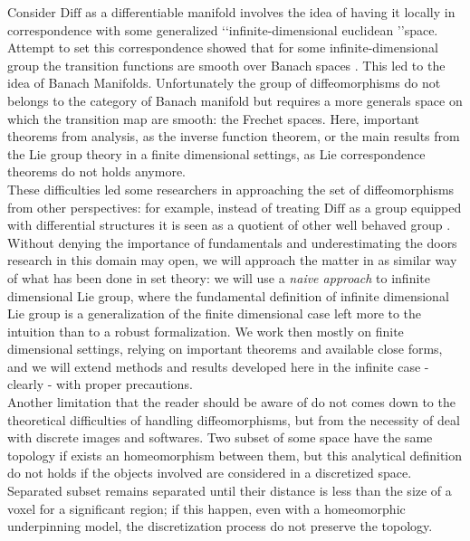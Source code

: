 Consider $\text{Diff}$ as a differentiable manifold involves the idea of having it locally in correspondence with some generalized \lq\lq infinite-dimensional euclidean \rq\rq space. Attempt to set this correspondence showed that for some infinite-dimensional group the transition functions are smooth over Banach spaces \cite{khesin2008geometry}. This led to the idea of Banach Manifolds. Unfortunately the group of diffeomorphisms do not belongs to the category of Banach manifold but requires a more generals space on which the transition map are smooth: the Frechet spaces. Here, important theorems from analysis, as the inverse function theorem, or the main results from the Lie group theory in a finite dimensional settings, as Lie correspondence theorems do not holds anymore.\\
These difficulties led some researchers in approaching the set of diffeomorphisms from other perspectives: 
for example, instead of treating $\text{Diff}$ as a group equipped with differential structures it is seen as a quotient of other well behaved group \cite{wojtynski1994one}.\\
Without denying the importance of fundamentals and underestimating the doors research in this domain may open, we will approach the matter in as similar way of what has been done in set theory: we will use a \emph{naive approach} to infinite dimensional Lie group, where the fundamental definition of infinite dimensional Lie group is a generalization of the finite dimensional case left more to the intuition than to a robust formalization. 
We work then mostly on finite dimensional settings, relying on important theorems and available close forms, and we will extend methods and results developed here in the infinite case -clearly - with proper precautions.\\

Another limitation that the reader should be aware of do not comes down to the theoretical difficulties of handling diffeomorphisms, but from the necessity of deal with discrete images and softwares. Two subset of some space have the same topology if exists an homeomorphism between them, but this analytical definition do not holds if the objects involved are considered in a discretized space. Separated subset remains separated until their distance is less than the size of a voxel for a significant region; if this happen, even with a homeomorphic underpinning model, the discretization process do not preserve the topology.\\


